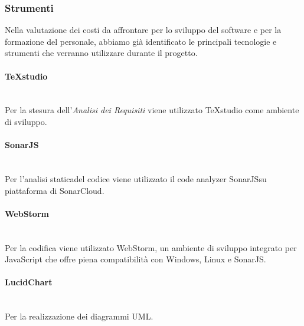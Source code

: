 \subsubsection{Strumenti}
Nella valutazione dei costi da affrontare per lo sviluppo del software e per la formazione del personale, abbiamo già identificato le principali tecnologie e strumenti che verranno utilizzare durante il progetto\glo.
\paragraph{TeXstudio}\mbox{}\\ [1mm]
Per la stesura dell'\textit{Analisi dei Requisiti} viene utilizzato TeXstudio come ambiente di sviluppo.
\paragraph{SonarJS}\mbox{}\\ [1mm]
Per l'analisi statica\glosp del codice viene utilizzato il code analyzer SonarJS\glosp su piattaforma di SonarCloud.
\paragraph{WebStorm}\mbox{}\\ [1mm]
Per la codifica viene utilizzato WebStorm, un ambiente di sviluppo integrato per JavaScript che offre piena compatibilità con Windows, Linux e SonarJS\glo.
\paragraph{LucidChart}\mbox{}\\ [1mm]
Per la realizzazione dei diagrammi UML\glo.	